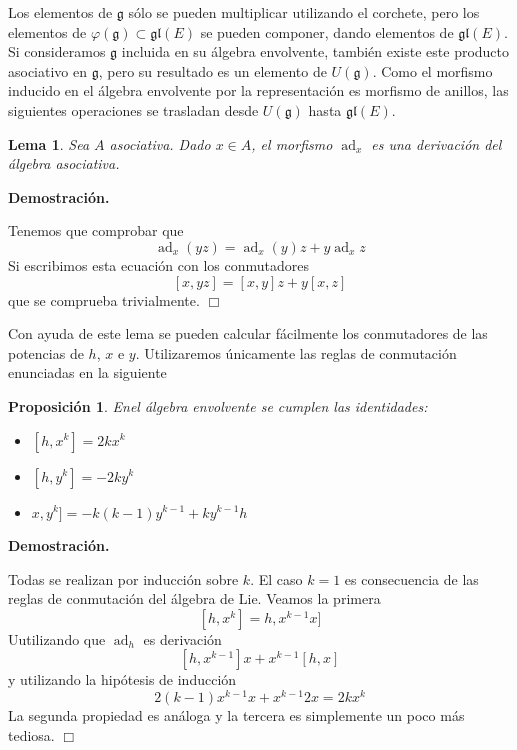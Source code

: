 \documentclass[a4paper,draft,12pt]{scrartcl}
\newtheorem{lema}[teo]{Lema}%
\newtheorem{propo}[teo]{Proposición}%
\newcommand{\dem}{\noindent \textbf{Demostración. }\vspace{0.3 cm}}%
\newcommand{\g}{\mathfrak{g}}%
\newcommand{\fin}{ $\Box $ \vspace{0.4 cm}}
\DeclareMathOperator{\ad}{ad}  %
\begin{document}
\bigskip

Los elementos de $\g$ sólo se pueden multiplicar utilizando el corchete, pero los elementos de $\varphi(\g)\subset \mathfrak{gl}(E)$ se pueden componer, dando elementos de $\mathfrak{gl}(E)$.  Si consideramos $\g$ incluida en su álgebra envolvente, también existe este producto asociativo en $\g$, pero su resultado es un elemento de $U(\g)$.  Como el morfismo inducido en el álgebra envolvente por la representación es morfismo de anillos, las siguientes operaciones se trasladan desde $U(\g)$ hasta $\mathfrak{gl}(E)$.

\begin{lema}

Sea $A$ asociativa.  Dado $x \in A$, el morfismo $\ad_x$ es una derivación del álgebra asociativa.

\end{lema}

\dem

Tenemos que comprobar que 
$$
\ad_x(yz)= \ad_x(y)z+y\ad_xz
$$
Si escribimos esta ecuación con los conmutadores
$$
[x,yz]=[x,y]z+y[x,z]
$$
que se comprueba trivialmente. \fin

Con ayuda de este lema se pueden calcular fácilmente los conmutadores de las potencias de $h$, $x$ e $y$. Utilizaremos únicamente las reglas de conmutación enunciadas en la siguiente

\begin{propo}

Enel álgebra envolvente se cumplen las identidades:

\begin{itemize}

\item $ [h,x^k]= 2kx^k$

\item $[h,y^k]= -2ky^k$

\item $ x,y^k]=-k(k-1)y^{k-1}+ky^{k-1}h$

\end{itemize}

\end{propo}

\dem


Todas se realizan por inducción sobre $k$.  El caso $k=1$ es consecuencia de las reglas de conmutación del álgebra de Lie.  Veamos la primera
$$
[h,x^k]= h,x^{k-1}x]
$$
Uutilizando que $\ad_h$ es derivación
$$
[h,x^{k-1}]x+x^{k-1}[h,x]
$$
y utilizando la hipótesis de inducción
$$
2(k-1)x^{k-1} x+x^{k-1}2x= 2kx^k
$$
La segunda propiedad es análoga y la tercera es simplemente un poco más tediosa. \fin
\end{document}

